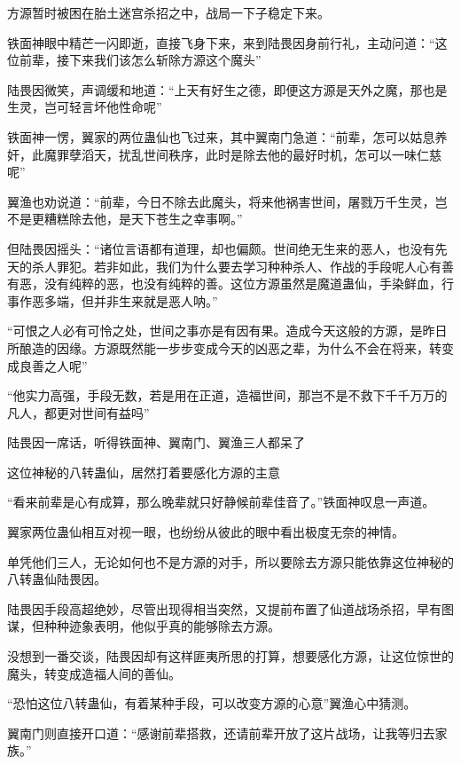 
\begin{this_body}



方源暂时被困在胎土迷宫杀招之中，战局一下子稳定下来。

铁面神眼中精芒一闪即逝，直接飞身下来，来到陆畏因身前行礼，主动问道：“这位前辈，接下来我们该怎么斩除方源这个魔头”

陆畏因微笑，声调缓和地道：“上天有好生之德，即便这方源是天外之魔，那也是生灵，岂可轻言坏他性命呢”

铁面神一愣，翼家的两位蛊仙也飞过来，其中翼南门急道：“前辈，怎可以姑息养奸，此魔罪孽滔天，扰乱世间秩序，此时是除去他的最好时机，怎可以一味仁慈呢”

翼渔也劝说道：“前辈，今日不除去此魔头，将来他祸害世间，屠戮万千生灵，岂不是更糟糕除去他，是天下苍生之幸事啊。”

但陆畏因摇头：“诸位言语都有道理，却也偏颇。世间绝无生来的恶人，也没有先天的杀人罪犯。若非如此，我们为什么要去学习种种杀人、作战的手段呢人心有善有恶，没有纯粹的恶，也没有纯粹的善。这位方源虽然是魔道蛊仙，手染鲜血，行事作恶多端，但并非生来就是恶人呐。”

“可恨之人必有可怜之处，世间之事亦是有因有果。造成今天这般的方源，是昨日所酿造的因缘。方源既然能一步步变成今天的凶恶之辈，为什么不会在将来，转变成良善之人呢”

“他实力高强，手段无数，若是用在正道，造福世间，那岂不是不救下千千万万的凡人，都更对世间有益吗”

陆畏因一席话，听得铁面神、翼南门、翼渔三人都呆了

这位神秘的八转蛊仙，居然打着要感化方源的主意

“看来前辈是心有成算，那么晚辈就只好静候前辈佳音了。”铁面神叹息一声道。

翼家两位蛊仙相互对视一眼，也纷纷从彼此的眼中看出极度无奈的神情。

单凭他们三人，无论如何也不是方源的对手，所以要除去方源只能依靠这位神秘的八转蛊仙陆畏因。

陆畏因手段高超绝妙，尽管出现得相当突然，又提前布置了仙道战场杀招，早有图谋，但种种迹象表明，他似乎真的能够除去方源。

没想到一番交谈，陆畏因却有这样匪夷所思的打算，想要感化方源，让这位惊世的魔头，转变成造福人间的善仙。

“恐怕这位八转蛊仙，有着某种手段，可以改变方源的心意”翼渔心中猜测。

翼南门则直接开口道：“感谢前辈搭救，还请前辈开放了这片战场，让我等归去家族。”


\end{this_body}
